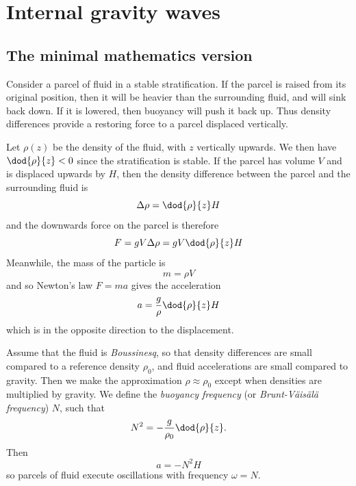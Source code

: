 \newpage
\section{Internal gravity waves} \label{section1}
\subsection{The minimal mathematics version}

Consider a parcel of fluid in a stable stratification. If the parcel is raised from its original position, then it will be heavier than the surrounding fluid, and will sink back down. If it is lowered, then buoyancy will push it back up. Thus density differences provide a restoring force to a parcel displaced vertically. 

Let $\rho(z)$ be the density of the fluid, with $z$ vertically upwards. We then have $\dod{\rho}{z} < 0$ since the stratification is stable. If the parcel has volume $V$ and is displaced upwards by $H$, then the density difference between the parcel and the surrounding fluid is 
\begin{equation}
	\Delta\rho = \dod{\rho}{z} H
\end{equation}
and the downwards force on the parcel is therefore
\begin{equation}
	F = gV\Delta\rho = gV\dod{\rho}{z}H
\end{equation}
Meanwhile, the mass of the particle is 
\begin{equation}
	m = \rho V
\end{equation}
and so Newton's law $F = ma$ gives the acceleration
\begin{equation}
	a = \frac{g}{\rho}\dod{\rho}{z} H
\end{equation}
which is in the opposite direction to the displacement.

Assume that the fluid is \textit{Boussinesq}, so that density differences are small compared to a reference density $\rho_0$, and fluid accelerations are small compared to gravity. Then we make the approximation $\rho\approx\rho_0$ except when densities are multiplied by gravity. We define the \textit{buoyancy frequency} (or \textit{Brunt-V\"ais\"al\"a frequency}) $N$, such that
\begin{equation}
	N^2 = -\frac{g}{\rho_0}\dod{\rho}{z}.
\end{equation}
Then 
\begin{equation}
	a = -N^2 H
\end{equation}
so parcels of fluid execute oscillations with frequency $\omega = N$.

